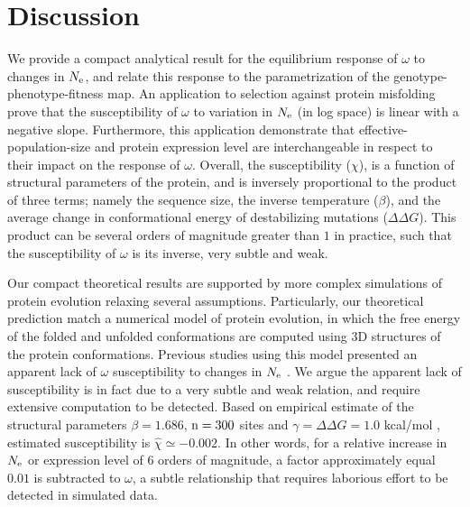 \section{Discussion}

We provide a compact analytical result for the equilibrium response of $\omega$ to changes in $N_{\mathrm{e}}$, and relate this response to the parametrization of the genotype-phenotype-fitness map.
An application to selection against protein misfolding prove that the susceptibility of $\omega$ to variation in $N_{\mathrm{e}}$ (in log space) is linear with a negative slope.
Furthermore, this application demonstrate that \gls{effective-population-size} and protein expression level are interchangeable in respect to their impact on the response of $\omega$.
Overall, the susceptibility ($\chi$), is a function of structural parameters of the protein, and is inversely proportional to the product of three terms; namely the sequence size, the inverse temperature ($\beta$), and the average change in conformational energy of destabilizing mutations ($\Delta \Delta G$). 
This product can be several orders of magnitude greater than $1$ in practice, such that the susceptibility of $\omega$ is its inverse, very subtle and weak. 


Our compact theoretical results are supported by more complex simulations of protein evolution relaxing several assumptions.
Particularly, our theoretical prediction match a numerical model of protein evolution, in which the free energy of the folded and unfolded conformations are computed using $3$D structures of the protein conformations.
Previous studies using this model presented an apparent lack of $\omega$ susceptibility to changes in $N_{\mathrm{e}}$ \citep{Goldstein2013}.
We argue the apparent lack of susceptibility is in fact due to a very subtle and weak relation, and require extensive computation to be detected.
Based on empirical estimate of the structural parameters $\beta = 1.686$, $\text{n}=300$ sites and $\gamma=\Delta \Delta G = 1.0$ kcal/mol \citep{Zeldovich2007}, estimated susceptibility is $\hat{\chi} \simeq -0.002$.
In other words, for a relative increase in $N_{\mathrm{e}}$ or expression level of $6$ orders of magnitude, a factor approximately equal $0.01$ is subtracted to $\omega$, a subtle relationship that requires laborious effort to be detected in simulated data.

